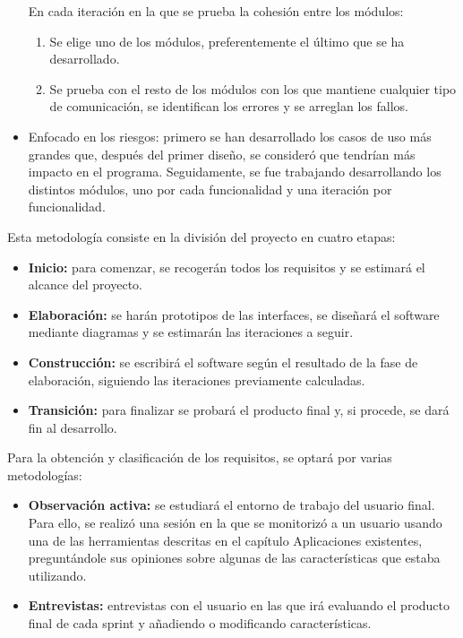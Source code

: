 \begin{itemize}
	En cada iteración en la que se prueba la cohesión entre los módulos:
	\begin{enumerate}
		\item Se elige uno de los módulos, preferentemente el último que se ha desarrollado.
		\item Se prueba con el resto de los módulos con los que mantiene cualquier tipo de comunicación, se identifican los errores y se arreglan los fallos.
	\end{enumerate}
	
	\item Enfocado en los riesgos: primero se han desarrollado los casos de uso más grandes que, después del primer diseño, se consideró que tendrían más impacto en el programa. Seguidamente, se fue trabajando desarrollando los distintos módulos, uno por cada funcionalidad y una iteración por funcionalidad.
	
\end{itemize}


Esta metodología consiste en la división del proyecto en cuatro etapas:
\begin{itemize}
    \item \textbf{Inicio:} para comenzar, se recogerán todos los requisitos y se estimará el alcance del proyecto.
    \item \textbf{Elaboración:} se harán prototipos de las interfaces, se diseñará el software mediante diagramas y se estimarán las iteraciones a seguir.
    \item \textbf{Construcción:} se escribirá el software según el resultado de la fase de elaboración, siguiendo las iteraciones previamente calculadas. 
    \item \textbf{Transición:} para finalizar se probará el producto final y, si procede, se dará fin al desarrollo.
\end{itemize}


Para la obtención y clasificación de los requisitos, se optará por varias metodologías:
\begin{itemize}
	\item \textbf{Observación activa:} se estudiará el entorno de trabajo del usuario final. Para ello, se realizó una sesión en la que se monitorizó a un usuario usando una de las herramientas descritas en el capítulo Aplicaciones existentes, preguntándole sus opiniones sobre algunas de las características que estaba utilizando.
	\item \textbf{Entrevistas:} entrevistas con el usuario en las que irá evaluando el producto final de cada sprint y añadiendo o modificando características.
\end{itemize}

